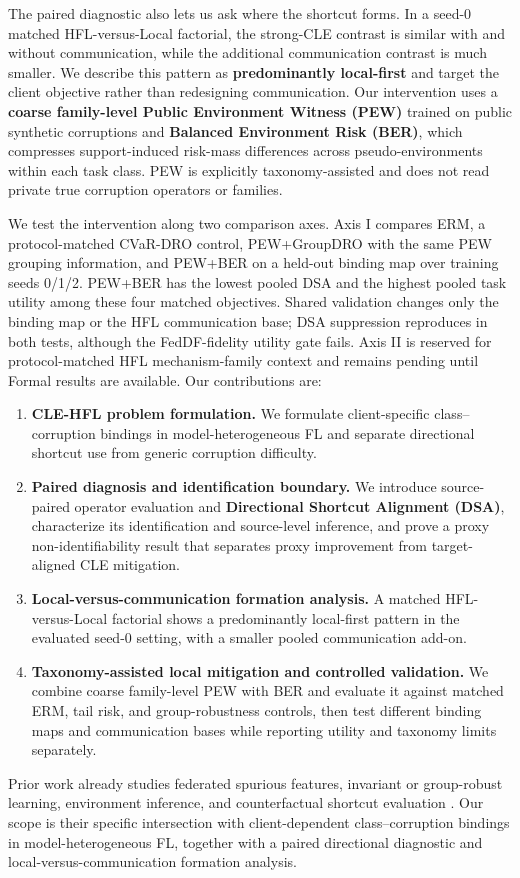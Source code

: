 The paired diagnostic also lets us ask where the shortcut forms. In a seed-0 matched HFL-versus-Local factorial, the strong-CLE contrast is similar with and without communication, while the additional communication contrast is much smaller. We describe this pattern as \textbf{predominantly local-first} and target the client objective rather than redesigning communication. Our intervention uses a \textbf{coarse family-level Public Environment Witness (PEW)} trained on public synthetic corruptions and \textbf{Balanced Environment Risk (BER)}, which compresses support-induced risk-mass differences across pseudo-environments within each task class. PEW is explicitly taxonomy-assisted and does not read private true corruption operators or families.

We test the intervention along two comparison axes. Axis I compares ERM, a protocol-matched CVaR-DRO control, PEW+GroupDRO with the same PEW grouping information, and PEW+BER on a held-out binding map over training seeds 0/1/2. PEW+BER has the lowest pooled DSA and the highest pooled task utility among these four matched objectives. Shared validation changes only the binding map or the HFL communication base; DSA suppression reproduces in both tests, although the FedDF-fidelity utility gate fails. Axis II is reserved for protocol-matched HFL mechanism-family context and remains pending until Formal results are available. Our contributions are:

\begin{enumerate}
\item \textbf{CLE-HFL problem formulation.} We formulate client-specific class--corruption bindings in model-heterogeneous FL and separate directional shortcut use from generic corruption difficulty.
\item \textbf{Paired diagnosis and identification boundary.} We introduce source-paired operator evaluation and \textbf{Directional Shortcut Alignment (DSA)}, characterize its identification and source-level inference, and prove a proxy non-identifiability result that separates proxy improvement from target-aligned CLE mitigation.
\item \textbf{Local-versus-communication formation analysis.} A matched HFL-versus-Local factorial shows a predominantly local-first pattern in the evaluated seed-0 setting, with a smaller pooled communication add-on.
\item \textbf{Taxonomy-assisted local mitigation and controlled validation.} We combine coarse family-level PEW with BER and evaluate it against matched ERM, tail risk, and group-robustness controls, then test different binding maps and communication bases while reporting utility and taxonomy limits separately.
\end{enumerate}

Prior work already studies federated spurious features, invariant or group-robust learning, environment inference, and counterfactual shortcut evaluation \citep{wang2024pflspurious,tang2024fedpin,ma2024fedcd,creager2021eiil,sagawa2020groupdro,vigneshwaran2026counterfactual}. Our scope is their specific intersection with client-dependent class--corruption bindings in model-heterogeneous FL, together with a paired directional diagnostic and local-versus-communication formation analysis.
